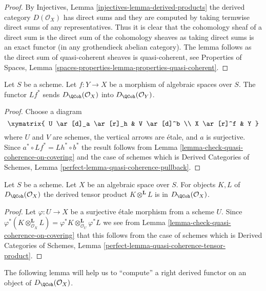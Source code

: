 \begin{proof}
By Injectives, Lemma \ref{injectives-lemma-derived-products}
the derived category $D(\mathcal{O}_X)$ has direct sums and
they are computed by taking termwise direct sums of any representatives.
Thus it is clear that the cohomology sheaf of a direct sum is the
direct sum of the cohomology sheaves as taking direct sums is
an exact functor (in any grothendieck abelian category). The lemma
follows as the direct sum of quasi-coherent sheaves is quasi-coherent, see
Properties of Spaces, Lemma
\ref{spaces-properties-lemma-properties-quasi-coherent}.
\end{proof}

\begin{lemma}
\label{lemma-quasi-coherence-pullback}
Let $S$ be a scheme.
Let $f : Y \to X$ be a morphism of algebraic spaces over $S$.
The functor $Lf^*$ sends $D_\QCoh(\mathcal{O}_X)$
into $D_\QCoh(\mathcal{O}_Y)$.
\end{lemma}

\begin{proof}
Choose a diagram
$$
\xymatrix{
U \ar[d]_a \ar[r]_h & V \ar[d]^b \\
X \ar[r]^f & Y
}
$$
where $U$ and $V$ are schemes, the vertical arrows are \'etale, and
$a$ is surjective. Since $a^* \circ Lf^* = Lh^* \circ b^*$ the result
follows from
Lemma \ref{lemma-check-quasi-coherence-on-covering}
and the case of schemes which is
Derived Categories of Schemes, Lemma
\ref{perfect-lemma-quasi-coherence-pullback}.
\end{proof}

\begin{lemma}
\label{lemma-quasi-coherence-tensor-product}
Let $S$ be a scheme. Let $X$ be an algebraic space over $S$.
For objects $K, L$ of $D_\QCoh(\mathcal{O}_X)$
the derived tensor product $K \otimes^\mathbf{L} L$ is in
$D_\QCoh(\mathcal{O}_X)$.
\end{lemma}

\begin{proof}
Let $\varphi : U \to X$ be a surjective \'etale morphism from a scheme $U$.
Since
$\varphi^*(K \otimes_{\mathcal{O}_X}^\mathbf{L} L) =
\varphi^*K \otimes_{\mathcal{O}_U}^\mathbf{L} \varphi^*L$
we see from
Lemma \ref{lemma-check-quasi-coherence-on-covering}
that this follows from the case of schemes which is
Derived Categories of Schemes, Lemma
\ref{perfect-lemma-quasi-coherence-tensor-product}.
\end{proof}

\noindent
The following lemma will help us to ``compute'' a right derived functor
on an object of $D_\QCoh(\mathcal{O}_X)$.

